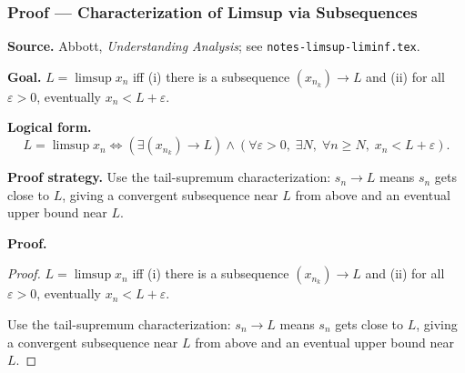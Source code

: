 

\clearpage
{}
\hypertarget{proof-RA-ABB-T-limsup-subseq-char}{}

\subsubsection[Characterization of Limsup via Subsequences]{Proof --- Characterization of Limsup via Subsequences}

\bigskip

\noindent
\textbf{Source.}
Abbott, \emph{Understanding Analysis}; see \texttt{notes-limsup-liminf.tex}.

\vspace{0.75em}

\noindent
\textbf{Goal.}
$L = \limsup x_n$ iff (i) there is a subsequence $(x_{n_k}) \to L$ and (ii) for all $\varepsilon > 0$, eventually $x_n < L + \varepsilon$.

\vspace{0.75em}

\noindent
\textbf{Logical form.}
\[
  L = \limsup x_n \Longleftrightarrow (\exists (x_{n_k}) \to L) \wedge (\forall \varepsilon > 0,\; \exists N,\; \forall n \ge N,\; x_n < L + \varepsilon).
\]

\vspace{0.75em}

\noindent
\textbf{Proof strategy.}
Use the tail-supremum characterization: $s_n \to L$ means $s_n$ gets close to $L$, giving a convergent subsequence near $L$ from above and an eventual upper bound near $L$.

\vspace{0.75em}

\noindent
\textbf{Proof.}
\begin{proof}
\Claim $L = \limsup x_n$ iff (i) there is a subsequence $(x_{n_k}) \to L$ and (ii) for all $\varepsilon > 0$, eventually $x_n < L + \varepsilon$.

\Given 

\Goal 

\Strategy Use the tail-supremum characterization: $s_n \to L$ means $s_n$ gets close to $L$, giving a convergent subsequence near $L$ from above and an eventual upper bound near $L$.

\medskip


\end{proof}

